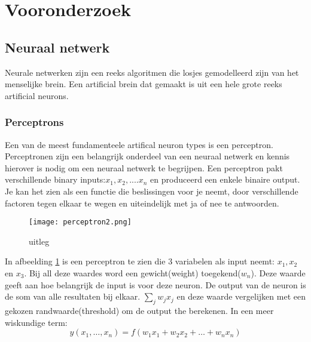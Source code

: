 \section{Vooronderzoek}

\subsection{Neuraal netwerk}
Neurale netwerken zijn een reeks algoritmen die losjes gemodelleerd zijn van het menselijke brein. Een artificial brein dat gemaakt is uit een hele grote reeks artificial neurons.

\subsubsection{Perceptrons}
Een van de meest fundamenteele artifical neuron types is een perceptron. Perceptronen zijn een belangrijk onderdeel van een neuraal netwerk en kennis hierover is nodig om een neuraal netwerk te begrijpen. Een perceptron pakt verschillende binary inputs:$x_{1}, x_{2},....x_{n}$ en produceerd een enkele binaire output. Je kan het zien als een functie die beslissingen voor je neemt, door verschillende factoren tegen elkaar te wegen en uiteindelijk met ja of nee te antwoorden.
\begin{figure}[h!]
\centering
\texttt{[image: perceptron2.png]}
\caption{uitleg}
\label{peceptron2}
\end{figure}
\linebreak
In afbeelding \ref{peceptron2} is een perceptron te zien die 3 variabelen als input neemt: $x_{1}, x_{2}$ en $x_{3}.$ Bij all deze waardes word een gewicht(weight) toegekend($w_{n}$). Deze waarde geeft aan hoe belangrijk de input is voor deze neuron. De output van de neuron is de som van alle resultaten bij elkaar. $\sum_{j}w_{j}x_{j}$ en deze waarde vergelijken met een gekozen randwaarde(threshold) om de output the berekenen. In een meer wiskundige term:
 \begin{equation}
    y(x_1,\ldots,x_n) = f(w_1x_1 + w_2x_2 + \ldots + w_nx_n)  \label{per-eq}
  \end{equation}
